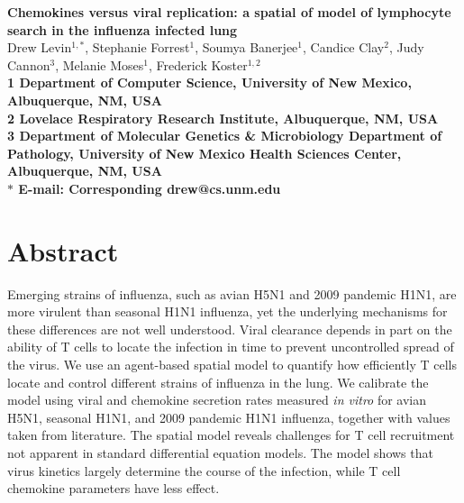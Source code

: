 \documentclass[10pt]{article}
\date{}
\begin{document}
\begin{flushleft}
{\Large
\textbf{Chemokines versus viral replication: a spatial of model of lymphocyte search in the influenza infected lung}
}
\\
Drew Levin$^{1,\ast}$, 
Stephanie Forrest$^{1}$, 
Soumya Banerjee$^{1}$,
Candice Clay$^{2}$, 
Judy Cannon$^{3}$,
Melanie Moses$^{1}$, 
Frederick Koster$^{1,2}$
\\
\bf{1} Department of Computer Science, University of New Mexico, Albuquerque, NM, USA
\\
\bf{2} Lovelace Respiratory Research Institute, Albuquerque, NM, USA
\\
\bf{3} Department of Molecular Genetics \& Microbiology Department of Pathology, University of New Mexico Health Sciences Center, Albuquerque, NM, USA
\\
$\ast$ E-mail: Corresponding drew@cs.unm.edu
\end{flushleft}



\section*{Abstract}

Emerging strains of influenza, such as avian H5N1 and 2009 pandemic H1N1, are more virulent than seasonal H1N1 influenza, yet the underlying mechanisms for these differences are not well understood.  Viral clearance depends in part on the ability of T cells to locate the infection in time to prevent uncontrolled spread of the virus.  We use an agent-based spatial model to quantify how efficiently T cells locate and control different strains of influenza in the lung.  We calibrate the model using viral and chemokine secretion rates measured \textit{in vitro} for avian H5N1, seasonal H1N1, and 2009 pandemic H1N1 influenza, together with values taken from literature.  The spatial model reveals challenges for T cell recruitment not apparent in standard differential equation models.  The model shows that virus kinetics largely determine the course of the infection, while T cell chemokine parameters have less effect.


\end{document}
